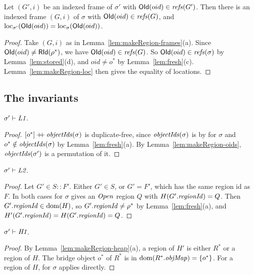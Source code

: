 \begin{lemma}
\label{lem:makeRegion-stack-oid}
Let $(G', i)$ be an indexed frame of $\sigma'$ with $\mathsf{OId}(oid) \in \mathit{refs}(G')$. Then there is an
indexed frame $(G, i)$ of $\sigma$ with $\mathsf{OId}(oid) \in \mathit{refs}(G)$, and
$\mathrm{loc}_{\sigma'}(\mathsf{OId}(oid)) = \mathrm{loc}_{\sigma}(\mathsf{OId}(oid))$.
\end{lemma}
\begin{proof}
Take $(G, i)$ as in Lemma~\ref{lem:makeRegion-frames}(a). Since $\mathsf{OId}(oid) \ne \mathsf{RId}(\rho^*)$, we have
$\mathsf{OId}(oid) \in \mathit{refs}(G)$. So $\mathsf{OId}(oid) \in \mathit{refs}(\sigma)$ by Lemma~\ref{lem:stored}(d), and
$oid \ne o^*$ by Lemma~\ref{lem:fresh}(c). Lemma~\ref{lem:makeRegion-loc} then gives the equality of
locations.
\end{proof}

\subsection{The invariants}

\begin{lemma}[\inv{L1}] 
$\sigma' \vdash \textit{L1}$.
\end{lemma}
\begin{proof}
$[o^*] \mathbin{+\!\!+} \mathit{objectIds}(\sigma)$ is duplicate-free, since $\mathit{objectIds}(\sigma)$ is by  for $\sigma$ and
$o^* \notin \mathit{objectIds}(\sigma)$ by Lemma~\ref{lem:fresh}(a). By Lemma~\ref{lem:makeRegion-oids},
$\mathit{objectIds}(\sigma')$ is a permutation of it.
\end{proof}

\begin{lemma}[\inv{L2}] 
$\sigma' \vdash \textit{L2}$.
\end{lemma}
\begin{proof}
Let $G' \in S :: F'$. Either $G' \in S$, or $G' = F'$, which has the same region id as $F$. In both
cases  for $\sigma$ gives an $\mathit{Open}$ region $Q$ with $H(G'.\mathit{regionId}) = Q$. Then
$G'.\mathit{regionId} \in \mathrm{dom}(H)$, so $G'.\mathit{regionId} \ne \rho^*$ by Lemma~\ref{lem:fresh}(a), and
$H'(G'.\mathit{regionId}) = H(G'.\mathit{regionId}) = Q$.
\end{proof}

\begin{lemma}[\inv{H1}] 
$\sigma' \vdash \textit{H1}$.
\end{lemma}
\begin{proof}
By Lemma~\ref{lem:makeRegion-heap}(a), a region of $H'$ is either $R^*$ or a region of $H$. The
bridge object $o^*$ of $R^*$ is in $\mathrm{dom}(R^*.\mathit{objMap}) = \{o^*\}$. For a region of $H$,  for
$\sigma$ applies directly.
\end{proof}

